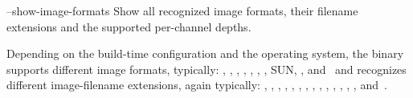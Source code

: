 \begin{codelist}


  \label{opt:show-image-formats}%
\item[--show-image-formats]\itemend
  Show all recognized image formats, their filename extensions and the supported per-channel
  depths.

  Depending on the build-time configuration and the operating system, the binary supports
  different image formats, typically: , , ,
  , , , , SUN, ,
  and~ and recognizes different image-filename extensions, again typically:
  , , , , ,
  , , , , ,
  , , , , and~.


\end{codelist}
